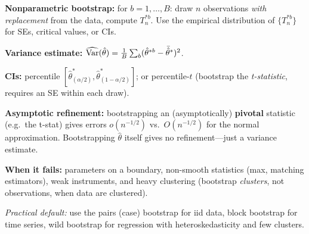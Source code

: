 \textbf{Nonparametric bootstrap:} for $b = 1,\ldots,B$: draw $n$ observations \textit{with replacement} from the data, compute $T_n^{*b}$. Use the empirical distribution of $\{T_n^{*b}\}$ for SEs, critical values, or CIs.

\textbf{Variance estimate:} $\widehat{\text{Var}}(\hat\theta) = \frac{1}{B}\sum_b (\hat\theta^{*b} - \bar{\hat\theta}^{*})^2$.

\textbf{CIs:} percentile $[\hat\theta^*_{(\alpha/2)}, \hat\theta^*_{(1-\alpha/2)}]$; or percentile-$t$ (bootstrap the \textit{t-statistic}, requires an SE within each draw).

\textbf{Asymptotic refinement:} bootstrapping an (asymptotically) \textbf{pivotal} statistic (e.g.\ the t-stat) gives errors $o(n^{-1/2})$ vs.\ $O(n^{-1/2})$ for the normal approximation. Bootstrapping $\hat\theta$ itself gives no refinement---just a variance estimate.

\textbf{When it fails:} parameters on a boundary, non-smooth statistics (max, matching estimators), weak instruments, and heavy clustering (bootstrap \textit{clusters}, not observations, when data are clustered).

\textit{Practical default:} use the pairs (case) bootstrap for iid data, block bootstrap for time series, wild bootstrap for regression with heteroskedasticity and few clusters.
